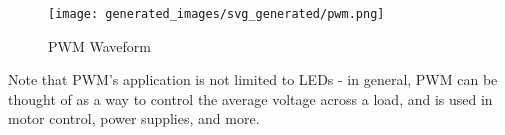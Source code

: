 \documentclass[main.tex]{subfiles}
\begin{document}
\begin{figure}[H]
    \centering
    \texttt{[image: generated\_images/svg\_generated/pwm.png]}
    \caption{PWM Waveform}
    \label{fig:pwm_waveform}
\end{figure}

\noindent Note that PWM's application is not limited to LEDs - in general, PWM can be thought of as a way to control the average voltage across a load, and is used in motor control, power supplies, and more. %
\end{document}
